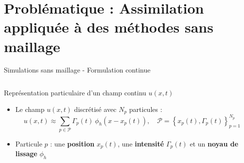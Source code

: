 \documentclass[aspectratio=169]{beamer} %
\begin{document}
\section{Problématique : Assimilation appliquée à des méthodes sans maillage}

\begin{frame}{Simulations sans maillage - Formulation continue}
    \begin{columns}[t]
        \begin{column}{0.7\textwidth}
            \begin{Definition}
                Représentation particulaire d'un champ continu $u(x,t)$\\
            \end{Definition}
            \begin{itemize}
                \item Le champ $u(x, t)$ discrétisé avec $N_p$ particules :
                      \begin{equation*}
                          u(x, t) \approx \sum_{p \in \mathcal P} \Gamma_p(t)~\phi_h(x - x_p(t)), \quad \mathcal P = \left\{x_p(t), \Gamma_p(t)\right\}_{p=1}^{N_p}
                      \end{equation*}
                \item Particule $p$ : une \textbf{position} $x_p(t)$, une \textbf{intensité} $\Gamma_p(t)$ et un \textbf{noyau de lissage} $\phi_h$


\end{itemize}
\end{column}
\end{columns}
\end{frame}
\end{document}
